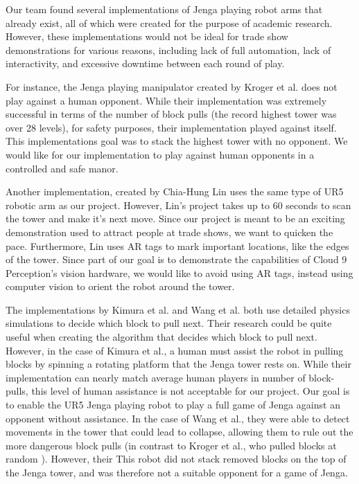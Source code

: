 Our team found several implementations of Jenga playing robot arms that already exist, all of which were created for the purpose of academic research. However, these implementations would not be ideal for trade show demonstrations for various reasons, including lack of full automation, lack of interactivity, and excessive downtime between each round of play.

For instance, the Jenga playing manipulator created by Kroger et al. \cite{kroger2008manipulator} does not play against a human opponent. While their implementation was extremely successful in terms of the number of block pulls (the record highest tower was over 28 levels), for safety purposes, their implementation played against itself. This implementations goal was to stack the highest tower with no opponent. We would like for our implementation to play against human opponents in a controlled and safe manor.

Another implementation, created by Chia-Hung Lin \cite{lin2018robot} uses the same type of UR5 robotic arm as our project. However, Lin's project takes up to 60 seconds to scan the tower and make it's next move. Since our project is meant to be an exciting demonstration used to attract people at trade shows, we want to quicken the pace. Furthermore, Lin uses AR tags to mark important locations, like the edges of the tower. Since part of our goal is to demonstrate the capabilities of Cloud 9 Perception's vision hardware, we would like to avoid using AR tags, instead using computer vision to orient the robot around the tower.

The implementations by Kimura et al. \cite{kimura2010force} and Wang et al. \cite{wang2009robot} both use detailed physics simulations to decide which block to pull next. Their research could be quite useful when creating the algorithm that decides which block to pull next. However, in the case of Kimura et al., a human must assist the robot in pulling blocks by spinning a rotating platform that the Jenga tower rests on. While their implementation can nearly match average human players in number of block-pulls, this level of human assistance is not acceptable for our project. Our goal is to enable the UR5 Jenga playing robot to play a full game of Jenga against an opponent without assistance. In the case of Wang et al., they were able to detect movements in the tower that could lead to collapse, allowing them to rule out the more dangerous block pulls (in contrast to Kroger et al., who pulled blocks at random \cite{kroger2008manipulator}). However, their  This robot did not stack removed blocks on the top of the Jenga tower, and was therefore not a suitable opponent for a game of Jenga. 
